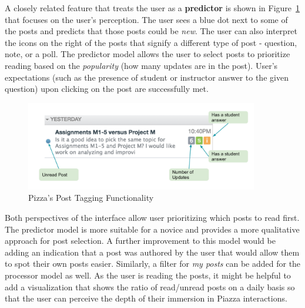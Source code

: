 \documentclass[12pt,letterpaper]{article}
\begin{document}
A closely related feature that treats the user as a \textbf{predictor} is shown in Figure~\ref{fig::2} that focuses on the user's perception. The user sees a blue dot next to some of the posts and predicts that those posts could be \textit{new}. The user can also interpret the icons on the right of the posts that signify a different type of post - question, note, or a poll. The predictor model allows the user to select posts to prioritize reading based on the \textit{popularity} (how many updates are in the post). User's expectations (such as the presence of student or instructor answer to the given question) upon clicking on the post are successfully met.  

\begin{figure}[H]
\centering
\includegraphics[width=4in, scale=.4]{piazza_predictor.png}
\caption{Pizza's Post Tagging Functionality}
\label{fig::2}
\end{figure}

Both perspectives of the interface allow user prioritizing which posts to read first. The predictor model is more suitable for a novice and provides a more qualitative approach for post selection. A further improvement to this model would be adding an indication that a post was authored by the user that would allow them to spot their own posts easier. Similarly, a filter for \textit{my posts} can be added for the processor model as well. As the user is reading the posts, it might be helpful to add a visualization that shows the ratio of read/unread posts on a daily basis so that the user can perceive the depth of their immersion in Piazza interactions.
\end{document}
